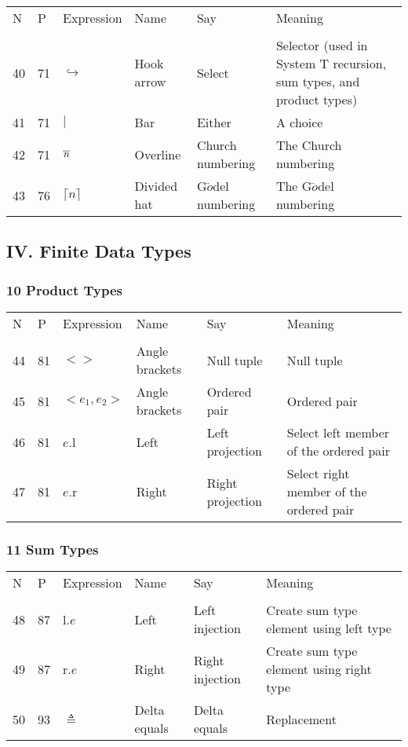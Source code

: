 \documentclass[12pt]{article}
\begin{document}
\begin{tabular}[b] {p{} p{} p{} p{} 
p{} p{}}
N & P & Expression & Name & Say & Meaning \\ \\

40& 71 & $\hookrightarrow$ & Hook arrow & Select & Selector (used in System T recursion, sum types, and product types)\\
41& 71 & $|$ & Bar & Either & A choice \\
42& 71 & $\overline{\it{n}}$ & Overline & Church numbering & The Church numbering \\
43& 76 & $\lceil n \rceil$ & Divided hat & G$\ddot{o}$del numbering & The G$\ddot{o}$del numbering \\
\end{tabular}
\subsection*{IV. Finite Data Types}
\subsubsection*{10 Product Types}
\begin{tabular}[b] {p{} p{} p{} p{} 
p{} p{}}
N & P & Expression & Name & Say & Meaning \\ \\

44& 81 & $<>$ & Angle brackets & Null tuple & Null tuple \\
45& 81 & $<e_1,e_2>$ & Angle brackets & Ordered pair & Ordered pair \\
46& 81 & $e.$l & Left & Left projection & Select left member of the ordered pair \\
47& 81 & $e.$r & Right & Right projection & Select right member of the ordered pair \\
\end{tabular}
\subsubsection*{11 Sum Types}
\begin{tabular}[b] {p{} p{} p{} p{} 
p{} p{}}
N & P & Expression & Name & Say & Meaning \\ \\

48& 87 & l.$e$ & Left & Left injection & Create sum type element using left type \\
49& 87 & r.$e$ & Right & Right injection & Create sum type element using right type \\
50& 93 & $\triangleq$ & Delta equals & Delta equals & Replacement \\
\end{tabular}
\end{document}
